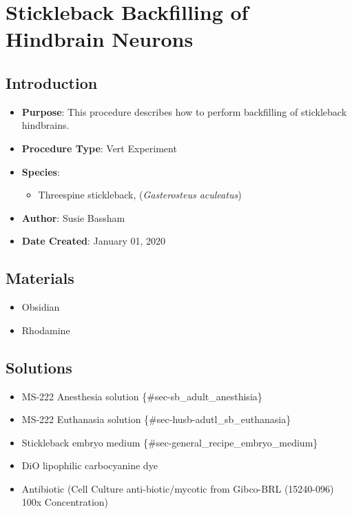 \documentclass[
  letterpaper,
  DIV=11,
  numbers=noendperiod]{scrreprt}
\providecommand{\tightlist}{%
  \setlength{\itemsep}{0pt}\setlength{\parskip}{0pt}}\usepackage{longtable,booktabs,array}
\begin{document}
\hypertarget{sec-Vert_Exp_hindbrain_backfill}{%
\chapter{Stickleback Backfilling of Hindbrain
Neurons}\label{sec-Vert_Exp_hindbrain_backfill}}

\hypertarget{introduction-49}{%
\section{Introduction}\label{introduction-49}}

\begin{itemize}
\tightlist
\item
  \textbf{Purpose}: This procedure describes how to perform backfilling
  of stickleback hindbrains.
\item
  \textbf{Procedure Type}: Vert Experiment
\item
  \textbf{Species}:

  \begin{itemize}
  \tightlist
  \item
    Threespine stickleback, (\emph{Gasterosteus aculeatus})
  \end{itemize}
\item
  \textbf{Author}: Susie Bassham
\item
  \textbf{Date Created}: January 01, 2020
\end{itemize}

\hypertarget{materials-45}{%
\section{Materials}\label{materials-45}}

\begin{itemize}
\tightlist
\item
  Obsidian
\item
  Rhodamine
\end{itemize}

\hypertarget{solutions-42}{%
\section{Solutions}\label{solutions-42}}

\begin{itemize}
\tightlist
\item
  MS-222 Anesthesia solution \{\#sec-sb\_adult\_anesthisia\}
\item
  MS-222 Euthanasia solution \{\#sec-husb-adutl\_sb\_euthanasia\}
\item
  Stickleback embryo medium \{\#sec-general\_recipe\_embryo\_medium\}
\item
  DiO lipophilic carbocyanine dye
\item
  Antibiotic (Cell Culture anti-biotic/mycotic from Gibco-BRL
  (15240-096) 100x Concentration)
\end{itemize}
\end{document}
